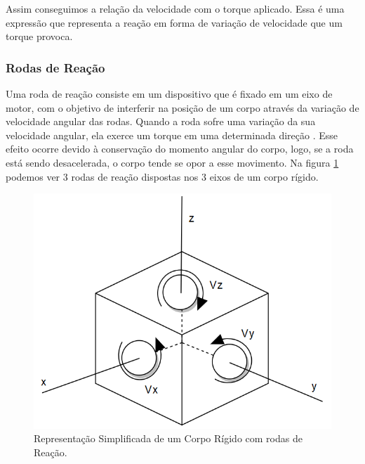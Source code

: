 Assim conseguimos a relação da velocidade com o torque aplicado. Essa é uma expressão que representa a reação em forma de variação de velocidade que um torque provoca.



\subsubsection{Rodas de Reação}

Uma roda de reação consiste em um dispositivo que é fixado em um eixo de motor, com o objetivo de interferir na posição de um corpo através da variação de velocidade angular das rodas. Quando a roda sofre uma variação da sua velocidade angular, ela exerce um torque em uma determinada direção \cite{BongWie2001}. Esse efeito ocorre devido à conservação do momento angular do corpo, logo, se a roda está sendo desacelerada, o corpo tende se opor a esse movimento. Na figura \ref{fig:satellite_controlhand_p1306} podemos ver 3 rodas de reação dispostas nos 3 eixos de um corpo rígido.

\begin{figure}[H]
  \caption{Representação Simplificada de um Corpo Rígido com rodas de Reação.}
  \begin{center}
      \includegraphics[scale=0.65]{referencial/img/satellite_controlhand_p1306}
  \end{center}
  \label{fig:satellite_controlhand_p1306}
\end{figure}

